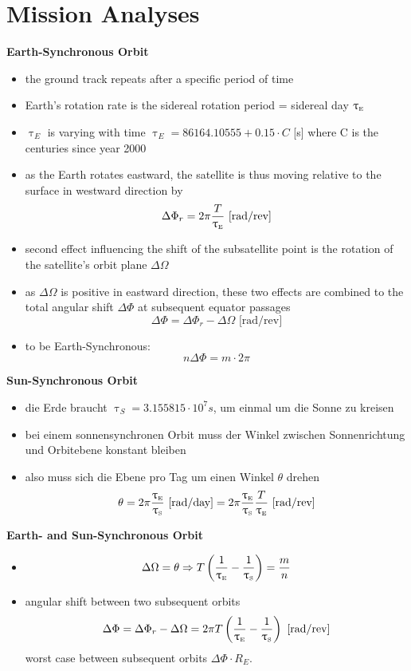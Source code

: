 \documentclass[a4paper,10pt]{article}
\newcommand{\f}{\textbf}
\begin{document}
\section{Mission Analyses}
\f{Earth-Synchronous Orbit}
\begin{itemize}
 \item the ground track repeats after a specific period of time
 \item Earth's rotation rate is the sidereal rotation period = sidereal day $\uptau_{\text{\tiny{E}}}$
 \item $\uptau_E$ is varying with time $\uptau_E = 86164.10555+0.15\cdot C$ [s] where C is the centuries since year 2000
 \item as the Earth rotates eastward, the satellite is thus moving relative to the surface in westward direction by 
 \[\Delta \Phi_r = 2\pi\frac{T}{\uptau_{\text{\tiny{E}}}} \text{ [rad/rev]}\] 
 \item second effect influencing the shift of the subsatellite point is the rotation of the satellite's orbit plane $\Delta \Omega$
 \item as $\Delta \Omega$ is positive in eastward direction, these two effects are combined to the total angular shift $\Delta \Phi$ at subsequent equator 
 passages \[\Delta \Phi = \Delta \Phi_r - \Delta \Omega \text{ [rad/rev]}\]
 \item to be Earth-Synchronous: 
 \[n\Delta \Phi = m \cdot 2\pi\]
\end{itemize}
\f{Sun-Synchronous Orbit}
\begin{itemize}
 \item die Erde braucht $\uptau_S = 3.155815\cdot 10^7 s$, um einmal um die Sonne zu kreisen 
 \item bei einem sonnensynchronen Orbit muss der Winkel zwischen Sonnenrichtung und Orbitebene konstant bleiben 
 \item also muss sich die Ebene pro Tag um einen Winkel $\theta$ drehen 
 \[\theta = 2\pi\frac{\uptau_{\text{\tiny{E}}}}{\uptau_{\text{\tiny{S}}}} \text{ [rad/day]} = 2\pi\frac{\uptau_{\text{\tiny{E}}}}{\uptau_{\text{\tiny{S}}}}\frac{T}{\uptau_{\text{\tiny{E}}}} \text{ [rad/rev]}\]
\end{itemize}
\f{Earth- and Sun-Synchronous Orbit}
\begin{itemize}
 \item \[\Delta \Omega = \theta \Rightarrow T\left(\frac{1}{\uptau_{\text{\tiny{E}}}} - \frac{1}{\uptau_{\text{\tiny{S}}}}\right) = \frac{m}{n}\]
 \item angular shift between two subsequent orbits 
 \[\Delta \Phi = \Delta \Phi_r - \Delta \Omega = 2\pi T\left(\frac{1}{\uptau_{\text{\tiny{E}}}} - \frac{1}{\uptau_{\text{\tiny{S}}}}\right) \text{ [rad/rev]}\]
 worst case between subsequent orbits $\Delta \Phi \cdot R_E$.
\end{itemize}
\end{document}
